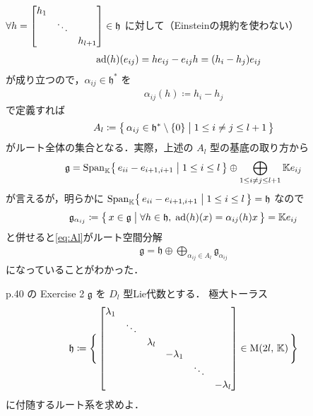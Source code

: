 \documentclass{ltjsarticle}
\theoremstyle{mystyle} %
\numberwithin{equation}{section}
\begin{document}
$\forall h = \mqty[\dmat{h_1,\ddots,h_{l+1}}] \in \mathfrak{h}$ に対して（Einsteinの規約を使わない）
\begin{align}
    \operatorname{ad}(h)(e_{ij}) &= he_{ij} - e_{ij}h = (h_i - h_j) e_{ij}
\end{align}
が成り立つので，$\alpha_{ij} \in \mathfrak{h}^*$ を
\begin{align}
    \alpha_{ij}(h) \coloneqq h_i - h_j
\end{align}
で定義すれば
\begin{align}
    A_l \coloneqq \bigl\{\, \alpha_{ij} \in \mathfrak{h}^* \setminus \{0\} \bigm| 1 \le i\neq j \le l+1\,\bigr\} 
\end{align}
がルート全体の集合となる．実際，上述の $A_l$ 型の基底の取り方から
\begin{align}
    \label{eq:Al}
    \mathfrak{g} = \operatorname{Span}_{\mathbb{K}} \bigl\{\, e_{ii} - e_{i+1,i+1} \bigm| 1\le i \le l \,\bigr\} \oplus \bigoplus_{1 \le i \neq j \le l+1} \mathbb{K}e_{ij}
\end{align}
が言えるが，明らかに $\operatorname{Span}_{\mathbb{K}} \bigl\{\, e_{ii} - e_{i+1,i+1} \bigm| 1\le i \le l \,\bigr\} = \mathfrak{h}$ なので
\begin{align}
    \mathfrak{g}_{\alpha_{ij}} \coloneqq \bigl\{\, x \in \mathfrak{g} \bigm| \forall h \in \mathfrak{h},\; \operatorname{ad}(h)(x) = \alpha_{ij}(h)x \,\bigr\} = \mathbb{K}e_{ij}
\end{align}
と併せると\eqref{eq:Al}がルート空間分解
\begin{align}
    \mathfrak{g} = \mathfrak{h} \oplus \bigoplus_{\alpha_{ij} \in A_l} \mathfrak{g}_{\alpha_{ij}}
\end{align}
になっていることがわかった．

\begin{myproblem}[label=ex:2-8-2D]{p.40 の Exercise 2}
    $\mathfrak{g}$ を $D_l$ 型Lie代数とする．
    極大トーラス
    \begin{align}
        \mathfrak{h} \coloneqq \Biggl\{\, \mqty[\dmat{\lambda_1,\ddots,\lambda_{l},-\lambda_{1},\ddots,-\lambda_{l}}] \in \Mat{2l}{\mathbb{K}} \,\Biggr\} 
    \end{align}
    に付随するルート系を求めよ．
\end{myproblem}
\end{document}
